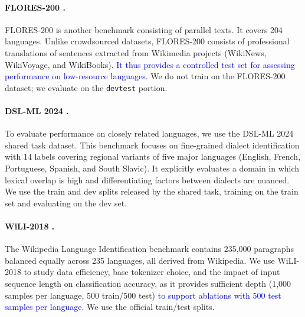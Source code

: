 \documentclass{article}
\newcommand{\corrrev}[1]{\textcolor{blue}{#1}}
\begin{document}
\paragraph{FLORES-200 \citep[eval only;][]{nllb2022}.} 
FLORES-200  is another benchmark consisting of parallel texts. It covers 204 languages. 
Unlike crowdsourced datasets, FLORES-200 consists of professional translations of sentences extracted from Wikimedia projects (WikiNews, WikiVoyage, and WikiBooks). 
\corrrev{It thus provides a controlled test set for assessing performance on low-resource languages.} We do not train on the FLORES-200 dataset; we evaluate on the \texttt{devtest} portion.


\paragraph{DSL-ML 2024 \cite{chifu-etal-2024-vardial}.}
To evaluate performance on closely related languages, we use the DSL-ML 2024 shared task dataset. This benchmark focuses on fine-grained dialect identification with 14 labels covering regional variants of five major languages  (English, French, Portuguese, Spanish, and South Slavic). 
It explicitly evaluates a domain in which lexical overlap is high and differentiating factors between dialects are nuanced. 
We use the train and dev splits released by the shared task, training on the train set and evaluating on the dev set. 



\paragraph{WiLI-2018 \citep{Thoma2018TheWB}.} The Wikipedia Language Identification benchmark  contains 235,000 paragraphs balanced equally across 235 languages, all derived from Wikipedia.
We use WiLI-2018 to study data efficiency, base tokenizer choice, and the impact of input sequence length on classification accuracy, as it provides sufficient depth (1,000 samples per language, 500 train/500 test) \corrrev{to support ablations with 500 test samples per language}.
We use the official train/test splits.
\end{document}
